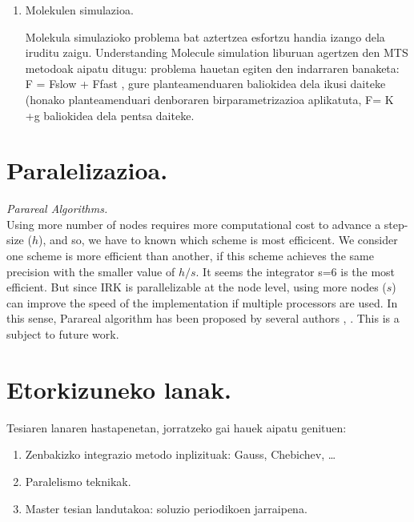 \begin{enumerate}
\item Molekulen simulazioa.

Molekula simulazioko problema bat aztertzea esfortzu handia izango dela iruditu zaigu. Understanding
Molecule simulation liburuan agertzen den MTS metodoak aipatu ditugu: problema hauetan egiten den
indarraren banaketa: F = Fslow + Ffast , gure planteamenduaren baliokidea dela ikusi daiteke (honako
planteamenduari denboraren birparametrizazioa aplikatuta, F= K +g baliokidea dela pentsa daiteke.

\end{enumerate}

\section{Paralelizazioa.}

\vspace{5mm}
\textit{Parareal Algorithms.}\\

Using more number of nodes requires more computational cost to advance a step-size ($h$), and so, we have to known which scheme is most efficicent. We consider one scheme is more efficient than another, if this scheme achieves the same precision with the smaller value of $h/s$. It seems the integrator s=6 is the most efficient. 
But since IRK is parallelizable at the node level, using more nodes ($s$) can improve the speed of the implementation if multiple processors are used. In this sense, Parareal algorithm has been proposed by several authors \cite{Gander2014}, \cite{Jimenez-Perez2011}. This is a subject to future work.

\section{Etorkizuneko lanak.}

Tesiaren lanaren hastapenetan, jorratzeko gai hauek aipatu genituen:
\begin{enumerate}
\item Zenbakizko integrazio metodo inplizituak: Gauss, Chebichev, \dots 
\item Paralelismo teknikak.
\item Master tesian landutakoa: soluzio periodikoen jarraipena.
\end{enumerate} 

